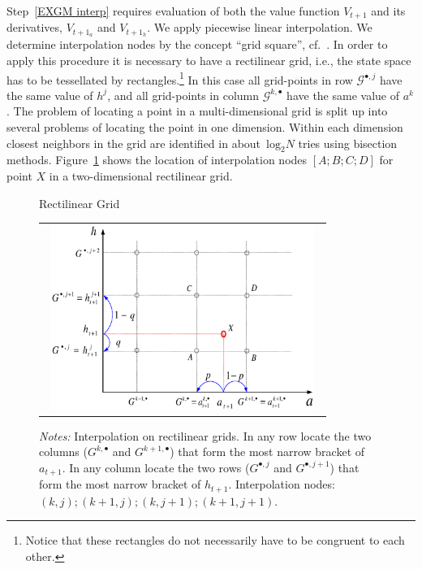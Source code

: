 \documentclass[a4paper,12pt]{article}
\begin{document}
Step~\ref{EXGM interp} requires evaluation of both the value function $V_{t+1}$ and its derivatives, $V_{t+1_{a}}$ and $V_{t+1_{h}}$. We apply piecewise linear interpolation. We determine interpolation nodes by the concept \textquotedblleft grid square\textquotedblright, cf.~. In order to apply this procedure it is necessary to have a rectilinear grid, i.e., the state space has to be tessellated by rectangles.\footnote{Notice that these rectangles do not necessarily have to be congruent to each other.}
In this case all grid-points in row $\mathcal{G}^{\bullet,j}$ have the same value of $h^{j}$, and all grid-points in column $\mathcal{G}^{k,\bullet}$ have the same value of $a^{k}$. The problem of locating a point in a multi-dimensional grid is split up into several problems of locating the point in one dimension. Within each dimension closest neighbors in the grid are identified in about~$\text{log}_{2}N$ tries using bisection methods. Figure~\ref{Rectilinear_Grid} shows the location of interpolation nodes $[A;B;C;D]$ for point $X$ in a two-dimensional rectilinear grid.
\begin{figure}[htb]
	\caption{Rectilinear Grid}
	\label{Rectilinear_Grid}
	\centering
	\begin{tabular}{c}
	\includegraphics[height=6.0cm, width=9.0cm]{Abbildungen/exo.eps} \\
	\end{tabular}
	\caption*{\footnotesize{\emph{Notes:} Interpolation on rectilinear grids. In any row locate the two columns ($G^{k,\bullet}$ and $G^{k+1,\bullet}$) that form the most narrow bracket of $a_{t+1}$. In any column locate the two rows ($G^{\bullet,j}$ and $G^{\bullet,j+1}$) that form the most narrow bracket of $h_{t+1}$. Interpolation nodes: $(k,j);(k+1,j);(k,j+1);(k+1,j+1)$.}}
\end{figure}
\end{document}
